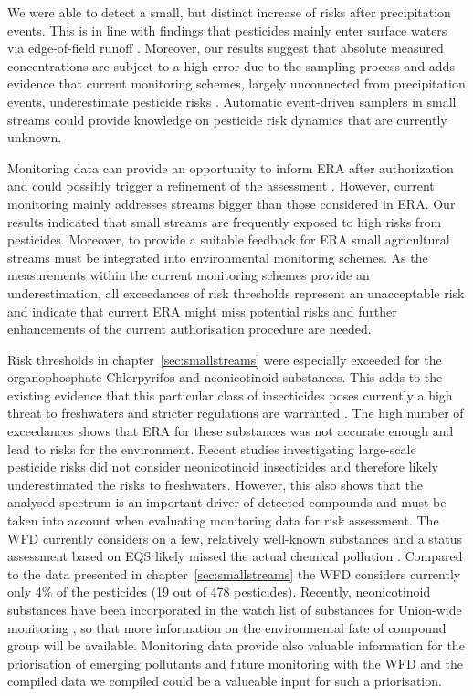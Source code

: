 We were able to detect a small, but distinct increase of risks after precipitation events. 
This is in line with findings that pesticides mainly enter surface waters via edge-of-field runoff \citep{schulz_comparison_2001}.
Moreover, our results suggest that absolute measured concentrations are subject to a high error due to the sampling process and adds evidence that current monitoring schemes, largely unconnected from precipitation events, underestimate pesticide risks \citep{xing_influences_2013, stehle_probabilistic_2013}. 
Automatic event-driven samplers in small streams could provide knowledge on pesticide risk dynamics that are currently unknown. 

Monitoring data can provide an opportunity to inform ERA after authorization and could possibly trigger a refinement of the assessment \citep{knauer_pesticides_2016}. 
However, current monitoring mainly addresses streams bigger than those considered in ERA.
Our results indicated that small streams are frequently exposed to high risks from pesticides.
Moreover, to provide a suitable feedback for ERA small agricultural streams must be integrated into environmental monitoring schemes. 
As the measurements within the current monitoring schemes provide an underestimation, all exceedances of risk thresholds represent an unacceptable risk and indicate that current ERA might miss potential risks and further enhancements of the current authorisation procedure are needed.

Risk thresholds in chapter~\ref{sec:smallstreams} were especially exceeded for the organophosphate Chlorpyrifos and neonicotinoid substances. 
This adds to the existing evidence that this particular class of insecticides poses currently a high threat to freshwaters and stricter regulations are warranted \citep{morrissey_neonicotinoid_2015, goulson_overview_2013}. 
The high number of exceedances shows that ERA for these substances was not accurate enough and lead to risks for the environment. 
Recent studies investigating large-scale pesticide risks did not consider neonicotinoid insecticides \citep{malaj_organic_2014, stehle_pesticide_2015} and therefore likely underestimated the risks to freshwaters. 
However, this also shows that the analysed spectrum is an important driver of detected compounds \citep{schreiner_pesticide_2016, malaj_organic_2014} and must be taken into account when evaluating monitoring data for risk assessment. 
The WFD currently considers on a few, relatively well-known substances \citep{european_union_directive_2013} and a status assessment based on EQS likely missed the actual chemical pollution \citep{moschet_how_2014}. 
Compared to the data presented in chapter~\ref{sec:smallstreams} the WFD considers currently only 4\% of the pesticides (19 out of 478 pesticides).
Recently, neonicotinoid substances have been incorporated in the watch list of substances for Union-wide monitoring \citep{european_union_commission_2015}, so that more information on the environmental fate of compound group will be available. 
Monitoring data provide also valuable information for the priorisation of emerging pollutants and future monitoring with the WFD \citep{brack_towards_2017} and the compiled data we compiled could be a valueable input for such a priorisation. 

